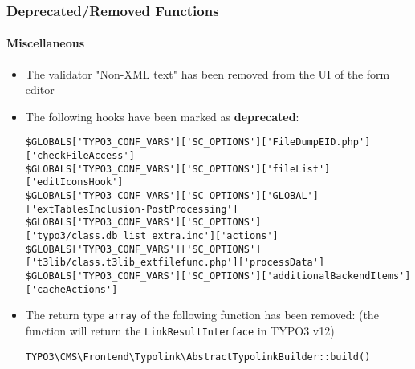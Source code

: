 %

\begin{frame}[fragile]
	\frametitle{Deprecated/Removed Functions}
	\framesubtitle{Miscellaneous}


	\begin{itemize}
		\item The validator "Non-XML text" has been removed from the UI of the form editor
		\item The following hooks have been marked as \textbf{deprecated}:
\begin{lstlisting}
$GLOBALS['TYPO3_CONF_VARS']['SC_OPTIONS']['FileDumpEID.php']['checkFileAccess']
$GLOBALS['TYPO3_CONF_VARS']['SC_OPTIONS']['fileList']['editIconsHook']
$GLOBALS['TYPO3_CONF_VARS']['SC_OPTIONS']['GLOBAL']['extTablesInclusion-PostProcessing']
$GLOBALS['TYPO3_CONF_VARS']['SC_OPTIONS']['typo3/class.db_list_extra.inc']['actions']
$GLOBALS['TYPO3_CONF_VARS']['SC_OPTIONS']['t3lib/class.t3lib_extfilefunc.php']['processData']
$GLOBALS['TYPO3_CONF_VARS']['SC_OPTIONS']['additionalBackendItems']['cacheActions']
\end{lstlisting}
		\item The return type \texttt{array} of the following function has been removed:\newline
			\smaller(the function will return the \texttt{LinkResultInterface} in TYPO3 v12)\normalsize
\begin{lstlisting}
TYPO3\CMS\Frontend\Typolink\AbstractTypolinkBuilder::build()
\end{lstlisting}

	\end{itemize}

\end{frame}

